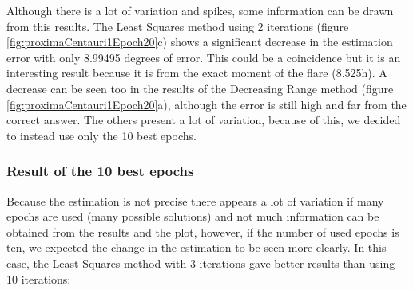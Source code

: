 Although there is a lot of variation and spikes, some information can be drawn from this results. The Least Squares method using 2 iterations (figure \ref{fig:proximaCentauri1Epoch20}c) shows a significant decrease in the estimation error with only 8.99495 degrees of error. This could be a coincidence but it is an interesting result because it is from the exact moment of the flare (8.525h). A decrease can be seen too in the results of the Decreasing Range method (figure \ref{fig:proximaCentauri1Epoch20}a), although the error is still high and far from the correct answer. The others present a lot of variation, because of this, we decided to instead use only the 10 best epochs.

\clearpage

\subsubsection{Result of the 10 best epochs}

Because the estimation is not precise there appears a lot of variation if many epochs are used (many possible solutions) and not much information can be obtained from the results and the plot, however, if the number of used epochs is ten, we expected the change in the estimation to be seen more clearly. In this case, the Least Squares method with 3 iterations gave better results than using 10 iterations:

